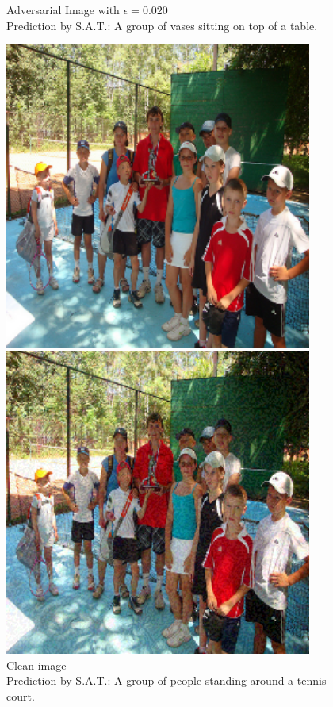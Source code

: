 \begin{figure}[ht]
\begin{minipage}{0.45\textwidth}
        \caption*{Adversarial Image with $\epsilon=0.020$\\Prediction by S.A.T.: A group of vases sitting on top of a table.}
    \end{minipage}
\end{figure}

\begin{figure}[ht]
    \centering
    \begin{minipage}{0.45\textwidth}
        \centering
        \includegraphics[width=0.9\textwidth]{figures/fast_method_group_of_people/group_of_people_0.000.png} %
        \caption*{Clean image\\Prediction by S.A.T.: A group of people standing around a tennis court.}
    \end{minipage}\hfill
    \begin{minipage}{0.45\textwidth}
        \centering
        \includegraphics[width=0.9\textwidth]{figures/fast_method_group_of_people/group_of_people_0.040.png} %

\end{minipage}
\end{figure}
